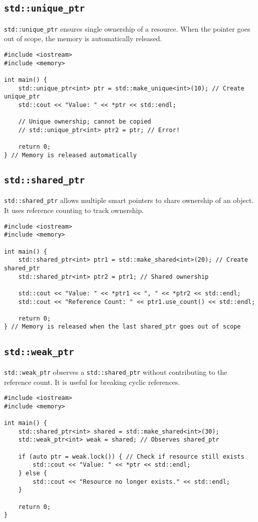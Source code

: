 \subsection{\texttt{std::unique\_ptr}}
\texttt{std::unique\_ptr} ensures single ownership of a resource. When the pointer goes out of scope, the memory is automatically released.

\begin{verbatim}
#include <iostream>
#include <memory>

int main() {
    std::unique_ptr<int> ptr = std::make_unique<int>(10); // Create unique_ptr
    std::cout << "Value: " << *ptr << std::endl;

    // Unique ownership; cannot be copied
    // std::unique_ptr<int> ptr2 = ptr; // Error!
    
    return 0;
} // Memory is released automatically
\end{verbatim}

\subsection{\texttt{std::shared\_ptr}}
\texttt{std::shared\_ptr} allows multiple smart pointers to share ownership of an object. It uses reference counting to track ownership.

\begin{verbatim}
#include <iostream>
#include <memory>

int main() {
    std::shared_ptr<int> ptr1 = std::make_shared<int>(20); // Create shared_ptr
    std::shared_ptr<int> ptr2 = ptr1; // Shared ownership

    std::cout << "Value: " << *ptr1 << ", " << *ptr2 << std::endl;
    std::cout << "Reference Count: " << ptr1.use_count() << std::endl;

    return 0;
} // Memory is released when the last shared_ptr goes out of scope
\end{verbatim}

\subsection{\texttt{std::weak\_ptr}}
\texttt{std::weak\_ptr} observes a \texttt{std::shared\_ptr} without contributing to the reference count. It is useful for breaking cyclic references.

\begin{verbatim}
#include <iostream>
#include <memory>

int main() {
    std::shared_ptr<int> shared = std::make_shared<int>(30);
    std::weak_ptr<int> weak = shared; // Observes shared_ptr

    if (auto ptr = weak.lock()) { // Check if resource still exists
        std::cout << "Value: " << *ptr << std::endl;
    } else {
        std::cout << "Resource no longer exists." << std::endl;
    }

    return 0;
}
\end{verbatim}


